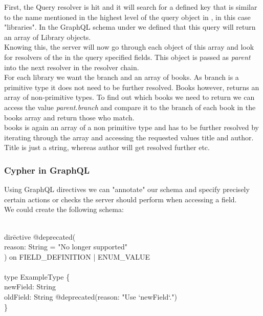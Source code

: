 First, the Query resolver is hit and it will search for a defined key that is similar to the name mentioned in the highest level of the query object in , in this case "libraries". In the GraphQL schema under  we defined that this query will return an array of Library objects. \\
Knowing this, the server will now go through each object of this array and look for resolvers of the in the query specified fields. This object is passed as \emph{parent} into the next resolver in the resolver chain. \\
For each library we want the branch and an array of books. As branch is a primitive type it does not need to be further resolved. Books however, returns an array of non-primitive types. To find out which books we need to return we can access the value \emph{parent.branch} and compare it to the branch of each book in the books array and return those who match. \\
books is again an array of a non primitive type and has to be further resolved by iterating through the array and accessing the requested values title and author. Title is just a string, whereas author will get resolved further etc.

\subsubsection{Cypher in GraphQL}
Using GraphQL directives we can "annotate" our schema and specify precisely certain actions or checks the server should perform when accessing a field. \\
We could create the following schema: 
\begin{exmp}
\label{ex245}
\begin{tabbing}
\\
dir\=ective @deprecated( \\
\>  reason: String = "No longer supported" \\
) on FIELD\_DEFINITION | ENUM\_VALUE \\
\\
type ExampleType \{ \\
\>  newField: String \\
\>  oldField: String @deprecated(reason: "Use `newField`.") \\
\}
\end{tabbing}
\end{exmp}


